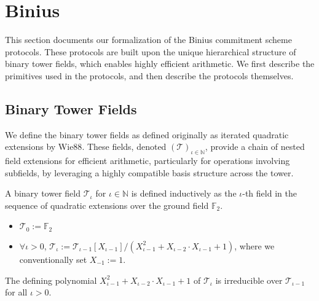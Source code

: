 \section{Binius}\label{sec:binius}

This section documents our formalization of the Binius commitment scheme protocols. These protocols are built upon the unique hierarchical structure of binary tower fields, which enables highly efficient arithmetic. We first describe the primitives used in the protocols, and then describe the protocols themselves.

\subsection{Binary Tower Fields}

We define the binary tower fields \cite{DP25} as defined originally as iterated quadratic extensions by Wie88\cite{Wie88}. These fields, denoted $(\mathcal{T})_{\iota \in \mathbb{N}}$, provide a chain of nested field extensions for efficient arithmetic, particularly for operations involving subfields, by leveraging a highly compatible basis structure across the tower.

\begin{definition}
    \label{def:binary_tower_field}
    A binary tower field $\mathcal{T}_{\iota}$ for $\iota \in \mathbb{N}$ is defined inductively as the $\iota$-th field in the sequence of quadratic extensions over the ground field $\mathbb{F}_2$.
    \begin{itemize}
        \item $\mathcal{T}_{0} := \mathbb{F}_{2}$
        \item $\forall \iota > 0$, $\mathcal{T}_{\iota} := \mathcal{T}_{\iota-1}[X_{\iota-1}] / (X_{\iota-1}^{2}+X_{\iota-2} \cdot X_{\iota-1}+1)$, where we conventionally set $X_{-1} := 1$.
    \end{itemize}
\end{definition}

\begin{theorem}
    \label{thm:binary_tower_field_irreducible}
    The defining polynomial $X_{\iota-1}^{2}+X_{\iota-2} \cdot X_{\iota-1}+1$ of $\mathcal{T}_{\iota}$ is irreducible over $\mathcal{T}_{\iota-1}$ for all $\iota > 0$.
\end{theorem}

